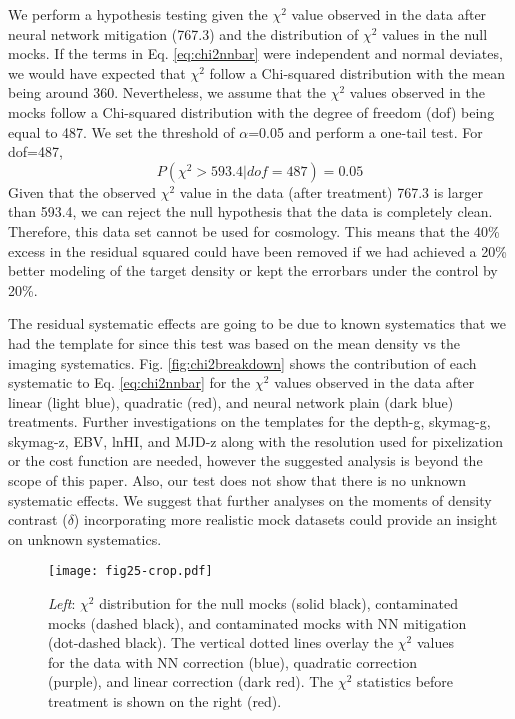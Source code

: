 We perform a hypothesis testing given the $\chi^{2}$ value observed in the data after neural network mitigation (767.3) and the distribution of $\chi^{2}$ values in the null mocks.
If the terms in Eq. \ref{eq:chi2nnbar} were independent and normal deviates, we would have expected that $\chi^{2}$ follow a Chi-squared distribution with the mean being around 360. Nevertheless, we assume that the $\chi^{2}$ values observed in the mocks follow a Chi-squared distribution with the degree of freedom (dof) being equal to 487. We set the threshold of $\alpha$=0.05 and perform a one-tail test. For dof=487,
\begin{equation}
    P(\chi^{2}>593.4 | dof=487) = 0.05
\end{equation}
Given that the observed $\chi^{2}$ value in the data (after treatment) 767.3 is larger than 593.4, we can reject the null hypothesis that the data is completely clean. Therefore, this data set cannot be used for cosmology. This means that the 40\% excess in the residual squared could have been removed if we had achieved a 20\% better modeling of the target density or kept the errorbars under the control by 20\%. 

The residual systematic effects are going to be due to known systematics that we had the template for since this test was based on the mean density vs the imaging systematics. Fig. \ref{fig:chi2breakdown} shows the contribution of each systematic to Eq. \ref{eq:chi2nnbar} for the $\chi^{2}$ values observed in the data after linear (light blue), quadratic (red), and neural network plain (dark blue) treatments. Further investigations on the templates for the depth-g, skymag-g, skymag-z, EBV, lnHI, and MJD-z along with the resolution used for pixelization or the cost function are needed, however the suggested analysis is beyond the scope of this paper. Also, our test does not show that there is no unknown systematic effects. We suggest that further analyses on the moments of density contrast ($\delta$) incorporating more realistic mock datasets could provide an insight on unknown systematics.

\begin{figure}
    \centering
    \texttt{[image: fig25-crop.pdf]}
    \caption{\textit{Left}: $\chi^{2}$ distribution for the null mocks (solid black), contaminated mocks (dashed black), and contaminated mocks with NN mitigation (dot-dashed black). The vertical dotted lines overlay the $\chi^{2}$ values for the data with NN correction (blue), quadratic correction (purple), and linear correction (dark red). The $\chi^{2}$ statistics before treatment is shown on the right (red).}
    \label{fig:chi2pdf}
\end{figure}

